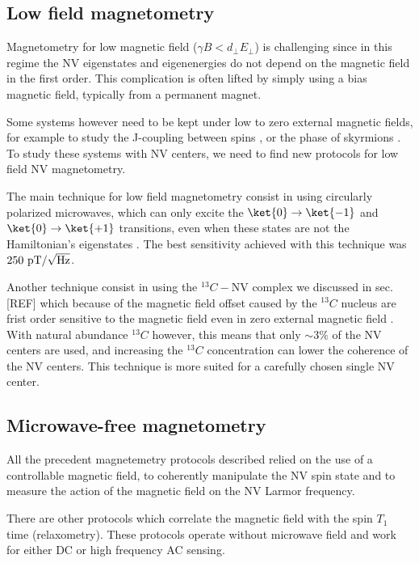 \documentclass[a4paper,11pt]{report}
\begin{document}
\subsection{Low field magnetometry}
Magnetometry for low magnetic field ($\gamma B < d_\perp E_\perp$) is challenging since in this regime the NV eigenstates and eigenenergies do not depend on the magnetic field in the first order. This complication is often lifted  by simply using a bias magnetic field, typically from a permanent magnet. 

Some systems however need to be kept under low to zero external magnetic fields, for example to study the J-coupling between spins \citep{sutter2012computational}, or the phase of skyrmions \citep{zazvorka2020skyrmion}. To study these systems with NV centers, we need to find new protocols for low field NV magnetometry.

The main technique for low field magnetometry consist in using circularly polarized microwaves, which can only excite the $\ket{0} \to \ket{-1}$ and $\ket{0} \to \ket{+1}$ transitions, even when these states are not the Hamiltonian's eigenstates \citep{mrozek2015circularly, zheng2019zero, lenz2021magnetic, vetter2022zero}. The best sensitivity achieved with this technique was $250\ \rm pT/\sqrt{\rm Hz}$.

Another technique consist in using the $^{13}C-$NV complex we discussed in sec. [REF] which because of the magnetic field offset caused by the $^{13}C$ nucleus are frist order sensitive to the magnetic field even in zero external magnetic field \citep{wang2022zero}. With natural abundance $^{13}C$ however, this means that only $\sim 3\%$ of the NV centers are used, and increasing the $^{13}C$ concentration can lower the coherence of the NV centers. This technique is more suited for a carefully chosen single NV center.

\subsection{Microwave-free magnetometry}
All the precedent magnetemetry protocols described relied on the use of a controllable magnetic field, to coherently manipulate the NV spin state and to measure the action of the magnetic field on the NV Larmor frequency.

There are other protocols which correlate the magnetic field with the spin $T_1$ time (relaxometry). These protocols operate without microwave field and work for either DC or high frequency AC sensing.
\end{document}
